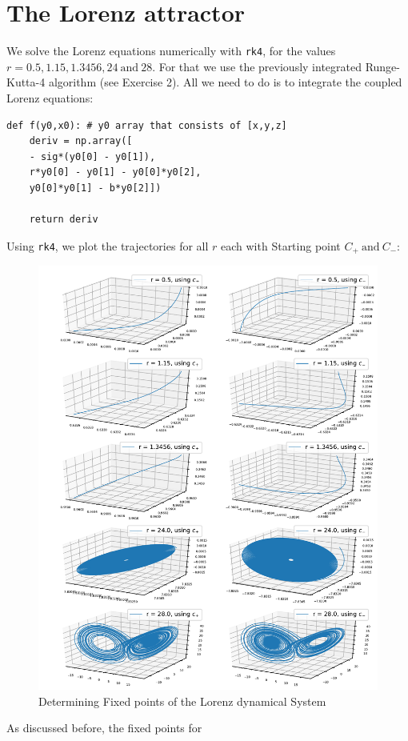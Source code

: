 \documentclass{article}
\begin{document}
\section{The Lorenz attractor}
We solve the Lorenz equations numerically with \texttt{rk4}, for the values
\( r = 0.5, 1.15, 1.3456, 24 \ \text{and} \ 28 \).
For that we use the previously integrated Runge-Kutta-4 algorithm
(see Exercise 2). All we need to do is to integrate the coupled Lorenz equations:
\begin{lstlisting}
def f(y0,x0): # y0 array that consists of [x,y,z]
    deriv = np.array([
    - sig*(y0[0] - y0[1]),
    r*y0[0] - y0[1] - y0[0]*y0[2],
    y0[0]*y0[1] - b*y0[2]])

    return deriv
\end{lstlisting}
Using \texttt{rk4}, we plot the trajectories for all \( r \) each with Starting
point \( C_+ \ \text{and} \ C_- \):
\begin{figure}[H]
    \centering
    \includegraphics[width=\textwidth]{Figure2-1.pdf} 
    \caption{Determining Fixed points of the Lorenz dynamical System} 
\end{figure}
As discussed before, the fixed points for 
\end{document}
